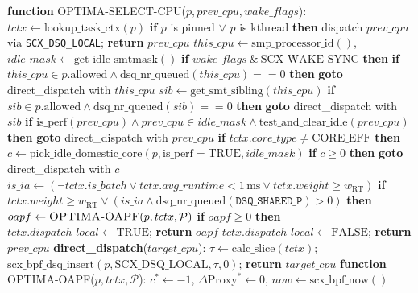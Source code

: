 \documentclass[letterpaper,twocolumn,10pt]{article}
\begin{document}
\begin{algorithm}[t]
\caption{OPTIMA CPU Selection \& Online Admissible Preemption Filter (OAPF)}
\label{alg:select_cpu}\label{alg:oapf}
\begin{algorithmic}[1]
\scriptsize\setlength{\itemsep}{0pt}
\STATE \textbf{function} \textsc{OPTIMA-SELECT-CPU}($p, prev\_cpu, wake\_flags$):
\STATE \quad $tctx \leftarrow \text{lookup\_task\_ctx}(p)$
\STATE \quad \textbf{if} $p$ is pinned $\lor$ $p$ is kthread \textbf{then} dispatch $prev\_cpu$ via \texttt{SCX\_DSQ\_LOCAL}; \textbf{return} $prev\_cpu$
\STATE \quad $this\_cpu \leftarrow \text{smp\_processor\_id}()$, $idle\_mask \leftarrow \text{get\_idle\_smtmask}()$
\STATE \quad \textbf{if} $wake\_flags \ \& \ \text{SCX\_WAKE\_SYNC}$ \textbf{then}
\STATE \quad \quad \textbf{if} $this\_cpu \in p.\text{allowed} \land \text{dsq\_nr\_queued}(this\_cpu) == 0$ \textbf{then} \textbf{goto} direct\_dispatch with $this\_cpu$
\STATE \quad \quad $sib \leftarrow \text{get\_smt\_sibling}(this\_cpu)$
\STATE \quad \quad \textbf{if} $sib \in p.\text{allowed} \land \text{dsq\_nr\_queued}(sib) == 0$ \textbf{then} \textbf{goto} direct\_dispatch with $sib$
\STATE \quad \textbf{if} $\text{is\_perf}(prev\_cpu) \land prev\_cpu \in idle\_mask \land \text{test\_and\_clear\_idle}(prev\_cpu)$ \textbf{then}
\STATE \quad \quad \textbf{goto} direct\_dispatch with $prev\_cpu$
\STATE \quad \textbf{if} $tctx.core\_type \ne \text{CORE\_EFF}$ \textbf{then}
\STATE \quad \quad $c \leftarrow \text{pick\_idle\_domestic\_core}(p, \text{is\_perf}=\text{TRUE}, idle\_mask)$
\STATE \quad \quad \textbf{if} $c \ge 0$ \textbf{then} \textbf{goto} direct\_dispatch with $c$
\STATE \quad $is\_ia \leftarrow (\neg tctx.is\_batch \lor tctx.avg\_runtime < 1\,\mathrm{ms} \lor tctx.weight \ge w_{\mathrm{RT}})$
\STATE \quad \textbf{if} $tctx.weight \ge w_{\mathrm{RT}} \lor (is\_ia \land \text{dsq\_nr\_queued}(\texttt{DSQ\_SHARED\_P}) > 0)$ \textbf{then}
\STATE \quad \quad $oapf \leftarrow \textsc{OPTIMA-OAPF}(p, tctx, \mathcal{P})$
\STATE \quad \quad \textbf{if} $oapf \ge 0$ \textbf{then} $tctx.dispatch\_local \leftarrow \text{TRUE}$; \textbf{return} $oapf$
\STATE \quad $tctx.dispatch\_local \leftarrow \text{FALSE}$; \textbf{return} $prev\_cpu$
\STATE \quad \textbf{direct\_dispatch}($target\_cpu$): $\tau \leftarrow \text{calc\_slice}(tctx)$; $\text{scx\_bpf\_dsq\_insert}(p, \text{SCX\_DSQ\_LOCAL}, \tau, 0)$; \textbf{return} $target\_cpu$
\STATE \textbf{function} \textsc{OPTIMA-OAPF}($p, tctx, \mathcal{P}$):
\STATE \quad $c^* \leftarrow -1$, $\Delta\mathrm{Proxy}^* \leftarrow 0$, $now \leftarrow \text{scx\_bpf\_now}()$

\end{algorithmic}
\end{algorithm}
\end{document}

